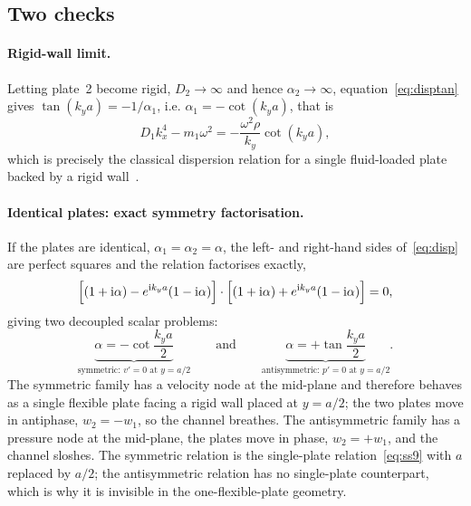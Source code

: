 \documentclass[11pt,a4paper]{article}
\newcommand{\ii}{\mathrm{i}}
\theoremstyle{plain}
\theoremstyle{remark}
\begin{document}
\subsection{Two checks}
\paragraph{Rigid-wall limit.} Letting plate~2 become rigid, $D_2\to\infty$ and hence
$\alpha_2\to\infty$, equation~\eqref{eq:disptan} gives $\tan(k_ya)=-1/\alpha_1$, i.e.
$\alpha_1=-\cot(k_ya)$, that is
\begin{equation}
D_1k_x^4-m_1\omega^2=-\frac{\omega^2\rho}{k_y}\cot(k_ya),
\label{eq:ss9}
\end{equation}
which is precisely the classical dispersion relation for a single fluid-loaded plate backed by a rigid
wall~\cite{sarkarsonti}.

\paragraph{Identical plates: exact symmetry factorisation.} If the plates are identical,
$\alpha_1=\alpha_2=\alpha$, the left- and right-hand sides of~\eqref{eq:disp} are perfect squares and
the relation factorises exactly,
\begin{equation}
\Bigl[(1+\ii\alpha)-e^{\ii k_ya}(1-\ii\alpha)\Bigr]\cdot
\Bigl[(1+\ii\alpha)+e^{\ii k_ya}(1-\ii\alpha)\Bigr]=0,
\label{eq:factor}
\end{equation}
giving two decoupled scalar problems:
\begin{equation}
\underbrace{\alpha=-\cot\frac{k_ya}{2}}_{\text{symmetric: }v'=0\text{ at }y=a/2}
\qquad\text{and}\qquad
\underbrace{\alpha=+\tan\frac{k_ya}{2}}_{\text{antisymmetric: }p'=0\text{ at }y=a/2}.
\label{eq:symanti}
\end{equation}
The symmetric family has a velocity node at the mid-plane and therefore behaves as a single flexible
plate facing a rigid wall placed at $y=a/2$; the two plates move in antiphase, $w_2=-w_1$, so the
channel breathes. The antisymmetric family has a pressure node at the mid-plane, the plates move in
phase, $w_2=+w_1$, and the channel sloshes. The symmetric relation is the single-plate
relation~\eqref{eq:ss9} with $a$ replaced by $a/2$; the antisymmetric relation has no single-plate
counterpart, which is why it is invisible in the one-flexible-plate geometry.
\end{document}

